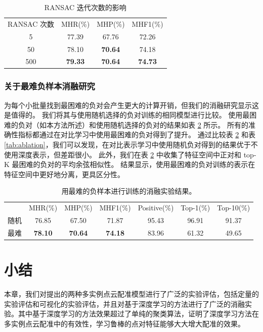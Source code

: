 \begin{table}
  \caption{
        RANSAC 迭代次数的影响
  }
  \centering
  \begin{tabular}{cccc}
    \hline\noalign{\smallskip}
    RANSAC 次数 & MHR(\%)         & MHP(\%)         & MHF1(\%)          \\
  \noalign{\smallskip}
  \hline
  \noalign{\smallskip}
  5   & 77.39          & 67.76          & 72.26              \\
  50  & 78.10          & \textbf{70.64} & 74.18                \\
  500 & \textbf{79.33} & \textbf{70.64} & \textbf{74.73}  \\  
  \hline
  \end{tabular}
  \label{tab:ransac}
\end{table}

\subsubsection{关于最难负样本消融研究}
\vspace{-0.3cm}
为每个小批量找到最困难的负对会产生更大的计算开销，但我们的消融研究显示这是值得的。
我们将其与使用随机选择的负对训练的相同模型进行比较。
使用最困难的负对（如本方法所述）和使用随机选择的负对的结果如表 \ref{tab:hardest} 所示。
所有的准确性指标都通过在对比学习中使用最困难的负对得到了提升。
通过比较表 \ref{tab:hardest} 和表 \ref{tab:ablation}，我们可以发现，在对比表示学习中使用随机负对得到的结果优于不使用深度表示，但差距很小。
此外，我们在表 \ref{tab:hardest} 中收集了特征空间中正对和 top-K 最困难的负对的平均余弦相似性。
结果显示，使用最困难的负对训练的表示在特征空间中更好地分离，更具区分性。

\begin{table}
  \caption{
        用最难的负样本进行训练的消融实验结果。
  }
  \centering
  \begin{tabular}{ccccccc}
    \hline\noalign{\smallskip}
    & MHR(\%) & MHP(\%) & MHF1(\%) & Positive(\%) & Top-1(\%) & Top-10(\%) \\
    \noalign{\smallskip}
    \hline
    \noalign{\smallskip}
    随机  & 76.85  & 67.50  & 71.87  & 95.43 & 96.91 & 91.37  \\
    最难 & \textbf{78.10} & \textbf{70.64} & \textbf{74.18} & 83.96 & 61.32 & 49.65 \\  
    \hline
  \end{tabular}
  \label{tab:hardest}
\end{table}


\section{小结}
本章，我们对提出的两种多实例点云配准模型进行了广泛的实验评估，包括定量的实验评估和可视化的实验评估，并且对基于深度学习的方法进行了广泛的消融实验。其中基于深度学习的方法效果超过了单纯的聚类算法，证明了深度学习方法在多实例点云配准中的有效性，学习鲁棒的点对特征能够大大增大配准的效果。